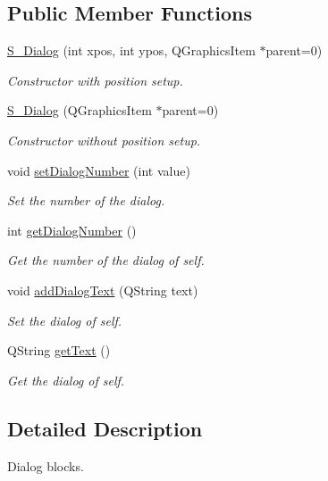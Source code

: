 \subsection*{Public Member Functions}
\begin{DoxyCompactItemize}
\item 
\hyperlink{class_s___dialog_a9b20a59ab0954ef8d9befdfbb556e398}{S\+\_\+\+Dialog} (int xpos, int ypos, Q\+Graphics\+Item $\ast$parent=0)
\begin{DoxyCompactList}\small\item\em Constructor with position setup. \end{DoxyCompactList}\item 
\hyperlink{class_s___dialog_a1694750fe7501bc3cd20eb97e1e3384f}{S\+\_\+\+Dialog} (Q\+Graphics\+Item $\ast$parent=0)
\begin{DoxyCompactList}\small\item\em Constructor without position setup. \end{DoxyCompactList}\item 
void \hyperlink{class_s___dialog_a139b0eb3a98042192ac78df37806f1ad}{set\+Dialog\+Number} (int value)
\begin{DoxyCompactList}\small\item\em Set the number of the dialog. \end{DoxyCompactList}\item 
int \hyperlink{class_s___dialog_ad26a628ae1d62d07e1b226126b04814f}{get\+Dialog\+Number} ()
\begin{DoxyCompactList}\small\item\em Get the number of the dialog of self. \end{DoxyCompactList}\item 
void \hyperlink{class_s___dialog_ac156dc3bb16b5c84bce3c710dae215f7}{add\+Dialog\+Text} (Q\+String text)
\begin{DoxyCompactList}\small\item\em Set the dialog of self. \end{DoxyCompactList}\item 
Q\+String \hyperlink{class_s___dialog_aac6c0556054892ff474f485b962027fd}{get\+Text} ()
\begin{DoxyCompactList}\small\item\em Get the dialog of self. \end{DoxyCompactList}\end{DoxyCompactItemize}


\subsection{Detailed Description}
Dialog blocks. 

